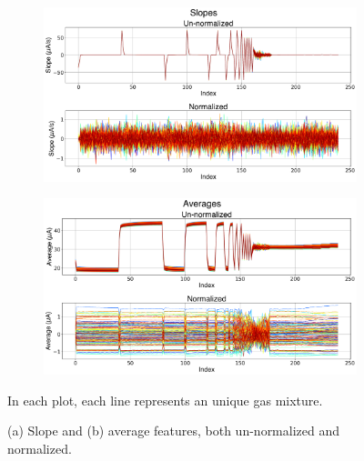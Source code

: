 \begin{figure}[!htb]
	\centering
	
	\begin{subfigure}[b]{1\textwidth}
		\includegraphics[width=1\linewidth]{../figures/slopes.png}
		\caption{}
		\label{fig:slopes} 
	\end{subfigure}
	
	\begin{subfigure}[b]{1\textwidth}
		\includegraphics[width=1\linewidth]{../figures/averages.png}
		\caption{}
		\label{fig:averages}
	\end{subfigure}

	\caption{(a) Slope and (b) average features, both un-normalized and normalized.}
	\small
	In each plot, each line represents an unique gas mixture.
	\label{fig:slopes-and-averages}
\end{figure}





